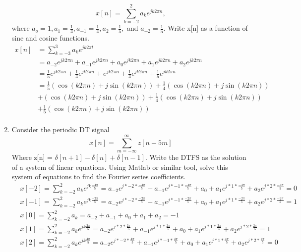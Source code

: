 \documentclass{article}
\begin{document}
\begin{enumerate}
    \begin{equation}
        x[n] = \sum_{k=-2}^2a_ke^{jk2\pi n},
    \end{equation}
    where $a_o = 1, a_1 = \frac{1}{4}, a_{-1} = \frac{1}{4}, a_2 = \frac{1}{5},$ and $a_{-2} = \frac{1}{5}$. Write x[n] as a function of sine and cosine functions.
        \begin{align}
        x[n] &= \sum_{k=-3}^3 a_ke^{jk2\pi t}\\
        &= a_{-2}e^{jk2\pi n} + a_{-1}e^{jk2\pi n} + a_{0}e^{jk2\pi n} + a_{1}e^{jk2\pi n} +  a_{2}e^{jk2\pi n}\\
        &= \frac{1}{5}e^{jk2\pi n} + \frac{1}{4}e^{jk2\pi n} + e^{jk2\pi n} + \frac{1}{4}e^{jk2\pi n} +  \frac{1}{5}e^{jk2\pi n}\\
        &= \frac{1}{5}(\cos(k2\pi n)+j\sin(k2\pi n)) + \frac{1}{4}(\cos(k2\pi n)+j\sin(k2\pi n)) \\ &+ (\cos(k2\pi n)+j\sin(k2\pi n))+ \frac{1}{4}(\cos(k2\pi n)+j\sin(k2\pi n)) \\ &+  \frac{1}{5}(\cos(k2\pi n)+j\sin(k2\pi n))\\
    \end{align}
    \newpage
    \item Consider the periodic DT signal
    \begin{equation}
        x[n] = \sum_{m=-\infty}^\infty z[n-5m]
    \end{equation}
    Where z[n] = $\delta[n+1] - \delta[n]+\delta[n-1].$ Write the DTFS as the solution of a system of linear equations. Using Matlab or similar tool, solve this system of equations to find the Fourier series coefficients.
    \begin{align}
        &x[-2] = \sum_{k=-2}^{2} a_ke^{jk\frac{-4\pi}{5}} = a_{-2}e^{j*-2*\frac{-4\pi}{5}} + a_{-1}e^{j*-1*\frac{-4\pi}{5}} + a_0 + a_1e^{j*1*\frac{-4\pi}{5}} + a_2e^{j*2*\frac{-4\pi}{5}} = 0\\
        &x[-1] = \sum_{k=-2}^{2} a_ke^{jk\frac{-2\pi}{5}} = a_{-2}e^{j*-2*\frac{-2\pi}{5}} + a_{-1}e^{j*-1*\frac{-2\pi}{5}} + a_0 + a_1e^{j*1*\frac{-2\pi}{5}} + a_2e^{j*2*\frac{-2\pi}{5}} = 1\\
        &x[0] = \sum_{k=-2}^{2} a_k = a_{-2} + a_{-1} + a_0 + a_1 + a_2 = -1\\
        &x[1] = \sum_{k=-2}^{2} a_ke^{jk\frac{2\pi}{5}} = a_{-2}e^{j*2*\frac{2\pi}{5}} + a_{-1}e^{j*1*\frac{2\pi}{5}} + a_0 + a_1e^{j*1*\frac{2\pi}{5}} + a_2e^{j*2*\frac{2\pi}{5}} = 1\\
        &x[2] = \sum_{k=-2}^{2} a_ke^{jk\frac{4\pi}{5}} = a_{-2}e^{j*-2*\frac{4\pi}{5}} + a_{-1}e^{j*-1*\frac{4\pi}{5}} + a_0 + a_1e^{j*1*\frac{4\pi}{5}} + a_2e^{j*2*\frac{4\pi}{5}} = 0\\

\end{align}
\end{enumerate}
\end{document}
